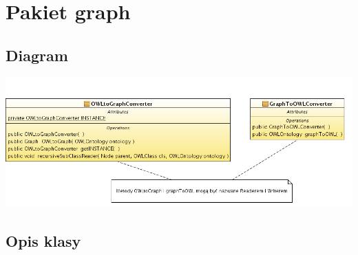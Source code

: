 \documentclass[a4paper,10pt]{article}
\begin{document}
\section{Pakiet graph}

\subsection{Diagram}

\includegraphics[width=\linewidth]{./modelowanie/OV_UML/GraphClassDiagram.png}

\subsection{Opis klasy}
\end{document}
